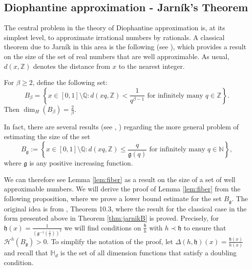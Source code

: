 \documentclass[11pt,a4paper]{amsart}
\begin{document}
\subsection{Diophantine approximation - Jarn\'ik's Theorem}\label{sec:dioph}

The central problem in the theory of Diophantine approximation is, at its simplest level, to approximate irrational numbers by rationals. A classical theorem due to Jarn\'ik in this area is the following (see \cite{fal86}), which provides a result on the size of the set of real numbers that are well approximable. As usual, $d(x,\mathbb Z)$ denotes the distance from $x$ to the nearest integer.
\begin{theorem}\label{thm:jarnikB}
For $\beta\ge2$, define the following set:
\[
B_\beta=\left\{x\in[0,1]\setminus {\mathbb{Q}}:
d(xq,\mathbb Z)<\frac{1}{q^{\beta-1}}\text{ for infinitely many }
q\in{\mathbb{Z}}\right\}.
\]
Then $\dim_H(B_\beta)=\frac{2}{\beta}$.
\end{theorem}

In fact, there are several results (see \cite{khi24}, \cite{jar31}) regarding the more general problem of estimating the size of the set
\begin{equation}\label{eq:Bg}
B_{\mathfrak{g}}:=\left\{x\in[0,1]\setminus {\mathbb{Q}}:
d(xq,\mathbb Z)\le\frac{q}{{\mathfrak{g}}(q)}\text{ for infinitely many }
q\in{\mathbb{N}}\right\},
\end{equation} 
where ${\mathfrak{g}}$ is any positive increasing function.

We can therefore see Lemma \ref{lem:fiber} as a result on the size of a set of well approximable numbers. We will derive the proof of Lemma \ref{lem:fiber} from the following proposition, where we prove a lower bound estimate for the set $B_{\mathfrak{g}}$. The original idea is from \cite{fal03}, Theorem 10.3, where the result for the classical case in the form presented above in Theorem \ref{thm:jarnikB} is proved. Precisely, for ${\mathfrak{h}}(x)=\frac{1}{\left({\mathfrak{g}}^{-1}(\frac{1}{x})\right)^2}$ we will find conditions on $\frac{\mathfrak{h}}{h}$ with $h\prec {\mathfrak{h}}$ to ensure that ${\mathcal{H}^{{h}}}(B_{\mathfrak{g}})>0$. To simplify the notation of the proof, let $\Delta(h,{\mathfrak{h}})(x)=\frac{{\mathfrak{h}}(x)}{h(x)}$ and recall that ${\mathbb{H}}_d$ is the set of all dimension functions that satisfy a doubling condition.
\end{document}
